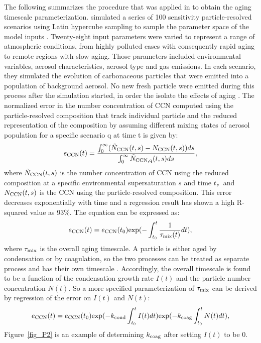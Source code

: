 \documentclass[12pt, fullpage]{uiucthesis2009}
\begin{document}
	The following summarizes the procedure that was applied in \citet{Fierce2016} to obtain the aging timescale parameterization. \citet{Fierce2016} simulated a series of 100 sensitivity particle-resolved scenarios using Latin hypercube sampling to sample the parameter space of the model inputs \citep{mckay1979comparison}. Twenty-eight input parameters were varied to represent a range of atmospheric conditions, from highly polluted cases with consequently rapid aging to remote regions with slow aging. Those parameters included environmental variables, aerosol characteristics, aerosol type and gas emissions. In each scenario, they simulated the evolution of carbonaceous particles that were emitted into a population of background aerosol. No new fresh particle were emitted during this process after the simulation started, in order the isolate the effects of aging \citep{Fierce2016}. The normalized error in the number concentration of CCN computed using the particle-resolved composition that track individual particle and the reduced representation of the composition by assuming different mixing states of aerosol population for a specific scenario q at time t is given by:
	\begin{align}\label{eq:11}
	e_{\rm CCN}(t) = \frac{\int_{0}^{\infty}( \tilde{N}_{\rm CCN}(t,s) - 
		N_{\rm CCN} (t,s))ds}{\int_{0}^{\infty} \tilde{N}_{\rm CCN, q}(t,s)ds},
	\end{align}
	where $\tilde{N}_{\rm CCN}(t,s)$ is the number concentration of CCN using the reduced composition at a specific environmental supersaturation $s$ and time $t$，and $N_{\rm CCN}(t,s)$ is the CCN using the particle-resolved composition. This error decreases exponentially with time and a regression result has shown a high R-squared value as 93$\%$. The equation can be expressed as:
	\begin{align}
	e_{\rm CCN}(t) = e_{\rm CCN}(t_{0})\text{exp}(-\int_{t_{0}}^{t}\frac{1}{\tau_{\rm mix}(t)} dt), 
	\end{align}
	where $\tau_{\rm mix}$ is the overall aging timescale. 
	A particle is either aged by condensation or by coagulation, so the two processes can be treated as separate process and has their own timescale \citep{Fierce2015}. Accordingly, the overall timescale is found to be a function of the condensation growth rate $I(t)$ and the particle number concentration $N(t)$.
	So a more specified parameterization of $\tau_{\rm mix}$ can be derived by regression of the error on $I(t)$ and $N(t)$:
	\begin{align}
	e_{\rm CCN}(t) = e_{\rm CCN}(t_{0})\text{exp}(-k_{\rm cond}\int_{t_{0}}^{t} I(t) dt)\text{exp}(-k_{\rm coag}\int_{t_{0}}^{t}N(t) dt), 
	\end{align}
	Figure~\ref{fig_P2} is an example of determining $k_{\rm coag}$ after setting $I(t)$ to be 0. 
	
\end{document}
